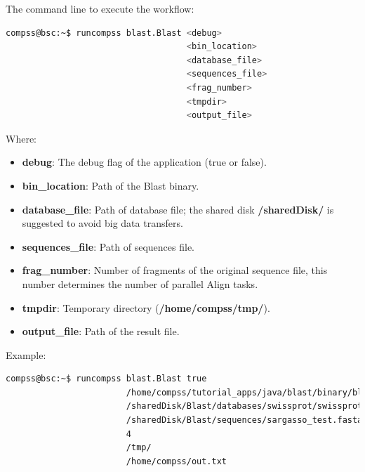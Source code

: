 The command line to execute the workflow:

\begin{lstlisting}[language=bash]
compss@bsc:~$ runcompss blast.Blast <debug> 
                                    <bin_location>
                                    <database_file> 
                                    <sequences_file>
                                    <frag_number> 
                                    <tmpdir>
                                    <output_file>
\end{lstlisting}

Where:
\begin{itemize}
 \item {\bf debug}: The debug flag of the application (true or false).
 \item {\bf bin\_location}: Path of the Blast binary.
 \item {\bf database\_file}: Path of database file; the shared disk {\bf /sharedDisk/} is suggested to avoid big data transfers.
 \item {\bf sequences\_file}: Path of sequences file.
 \item {\bf frag\_number}: Number of fragments of the original sequence file, this number determines the number of parallel Align tasks.
 \item {\bf tmpdir}: Temporary directory ({\bf /home/compss/tmp/}).
 \item {\bf output\_file}: Path of the result file.
\end{itemize}
 
Example:
\begin{lstlisting}[language=bash]
compss@bsc:~$ runcompss blast.Blast true
                        /home/compss/tutorial_apps/java/blast/binary/blastall
                        /sharedDisk/Blast/databases/swissprot/swissprot
                        /sharedDisk/Blast/sequences/sargasso_test.fasta 
                        4 
                        /tmp/
                        /home/compss/out.txt
\end{lstlisting}